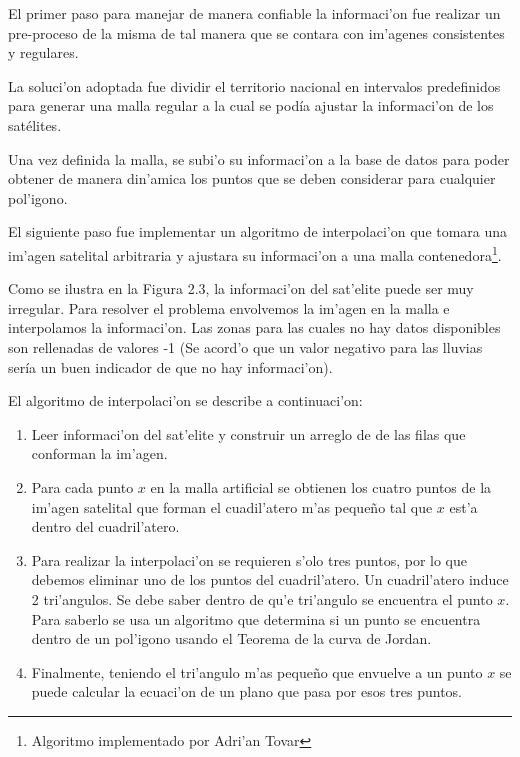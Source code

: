   El primer paso para manejar de manera confiable la informaci'on fue realizar un pre-proceso de la misma
  de tal manera que se contara con im'agenes consistentes y regulares.

  La soluci'on adoptada fue dividir el territorio nacional en intervalos predefinidos para generar una malla regular
  a la cual se podía ajustar la informaci'on de los satélites.

  Una vez definida la malla, se subi'o su informaci'on a la base de datos para poder obtener 
  de manera din'amica los puntos que se deben considerar para cualquier pol'igono. 

  El siguiente paso fue implementar un algoritmo de interpolaci'on que tomara una im'agen satelital arbitraria y 
  ajustara su informaci'on a una malla contenedora\footnote{Algoritmo
    implementado por Adri'an Tovar}.

 Como se ilustra en la Figura 2.3, la informaci'on del sat'elite puede ser muy irregular. Para resolver el problema 
  envolvemos la im'agen en la malla e interpolamos la informaci'on. Las zonas para las cuales no hay datos disponibles
  son rellenadas de valores -1 (Se acord'o que un valor negativo para las lluvias sería un buen indicador de que no hay
  informaci'on).

  El algoritmo de interpolaci'on se describe a continuaci'on:

  \begin{enumerate}
    \item Leer informaci'on del sat'elite y construir un arreglo de
      de las filas que conforman la im'agen.
    \item Para cada punto $x$ en la malla artificial se obtienen los
      cuatro puntos de la im'agen satelital que forman el cuadil'atero
      m'as peque\~no tal que  $x$ est'a dentro del cuadril'atero.
    \item Para realizar la interpolaci'on se requieren s'olo tres
      puntos, por lo que debemos eliminar uno de los puntos del
      cuadril'atero. Un cuadril'atero induce 2 tri'angulos. Se debe
      saber dentro de qu'e tri'angulo se encuentra el punto $x$. Para
      saberlo se usa un algoritmo que determina si un punto se
      encuentra dentro de un pol'igono usando el Teorema de la curva
      de Jordan.
    \item Finalmente, teniendo el tri'angulo m'as peque\~no que
      envuelve a un punto $x$ se puede calcular la ecuaci'on de un
      plano que pasa por esos tres puntos.
  \end{enumerate}

